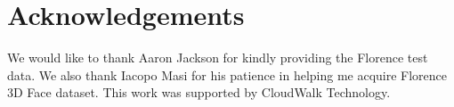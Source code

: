 \documentclass[runningheads]{llncs}
\begin{document}
\section{Acknowledgements}
We would like to thank Aaron Jackson for kindly providing the Florence test data. We also thank Iacopo Masi for his patience in helping me acquire  Florence 3D Face dataset. This work was supported by CloudWalk Technology.









\end{document}
